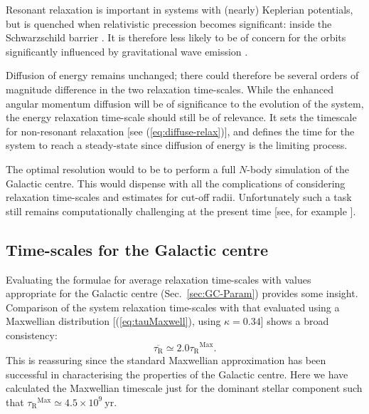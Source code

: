 \documentclass[useAMS,usedcolumn,usegraphicx,usenatbib]{mn2e}
\newcommand{\eqnref}[1]{(\ref{eq:#1})}
\newcommand{\secref}[1]{Sec.~\ref{sec:#1}}
\newcommand{\units}[1]{\ensuremath{~\mathrm{#1}}}
\newcommand{\sub}[1]{\ensuremath{_\mathrm{#1}}}
\newcommand{\super}[1]{\ensuremath{^\mathrm{#1}}}
\begin{document}
\begin{onecolumn}
Resonant relaxation is important in systems with (nearly) Keplerian potentials, but is quenched when relativistic precession becomes significant: inside the Schwarzschild barrier \citep{Merritt2011}. It is therefore less likely to be of concern for the orbits significantly influenced by gravitational wave emission \citep{Sigurdsson1997}.

Diffusion of energy remains unchanged; there could therefore be several orders of magnitude difference in the two relaxation time-scales. While the enhanced angular momentum diffusion will be of significance to the evolution of the system, the energy relaxation time-scale should still be of relevance. It sets the timescale for non-resonant relaxation [see \eqnref{diffuse-relax}], and defines the time for the system to reach a steady-state since diffusion of energy is the limiting process.

The optimal resolution would to be to perform a full $N$-body simulation of the Galactic centre. This would dispense with all the complications of considering relaxation time-scales and estimates for cut-off radii. Unfortunately such a task still remains computationally challenging at the present time [see, for example \citet{Li2012}].

\subsection{Time-scales for the Galactic centre}\label{sec:tauGC}

Evaluating the formulae for average relaxation time-scales with values appropriate for the Galactic centre (\secref{GC-Param}) provides some insight. Comparison of the system relaxation time-scales with that evaluated using a Maxwellian distribution [\eqnref{tauMaxwell}, using $\kappa = 0.34$] shows a broad consistency:
\begin{equation}
\overline{\tau\sub{R}} \simeq 2.0 \tau\sub{R}\super{Max}.
\end{equation}
This is reassuring since the standard Maxwellian approximation has been successful in characterising the properties of the Galactic centre. Here we have calculated the Maxwellian timescale just for the dominant stellar component such that $\tau\sub{R}\super{Max}\simeq 4.5 \times 10^9\units{yr}$.


\end{onecolumn}
\end{document}
